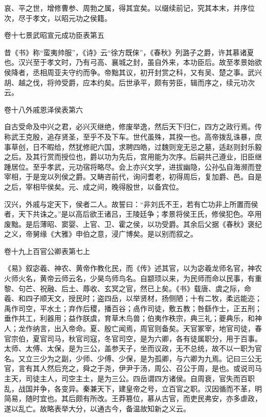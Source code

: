 \documentclass[12pt,UTF8]{ctexbook}
\begin{document}
哀、平之世，增修曹参、周勃之属，得其宜矣。以缀续前记，究其本末，并序位次，尽于孝文，以昭元功之侯籍。





卷十七景武昭宣元成功臣表第五



昔《书》称“蛮夷帅服”，《诗》云“徐方既俫”，《春秋》列潞子之爵，许其慕诸夏也。汉兴至于孝文时，乃有弓高、襄城之封，虽自外来，本功臣后。故至孝景始欲侯降者，丞相周亚夫守约而争。帝黜其议，初开封赏之科，又有吴、楚之事。武兴胡、越之伐，将帅受爵，应本约矣。后世承平，颇有劳臣，辑而序之，续元功次云。





卷十八外戚恩泽侯表第六



自古受命及中兴之君，必兴灭继绝，修废举逸，然后天下归仁，四方之政行焉。传称武王克殷，追存贤圣，至乎不及下车。世代虽殊，其揆一也。高帝拨乱诛暴，庶事草创，日不暇给，然犹修祀六国，求聘四皓，过魏则宠无忌之墓，适赵则封乐毅之后。及其行赏而授位也，爵以功为先后，宫用能为次序。后嗣共己遵业，旧臣继踵居位。至乎孝武，元功宿将略尽。会上亦兴文学，进拔幽隐，公孙弘自海濒而登宰相，于是宠以列侯之爵。又畴咨前代，询问耆老，初得周后，复加爵、邑。自是之后，宰相毕侯矣。元、成之间，晚得殷世，以备宾位。



汉兴，外戚与定天下，侯者二人。故誓曰：“非刘氏不王，若有亡功非上所置而侯者，天下共诛之。”是以高后欲王诸吕，王陵廷争；孝景将侯王氏，修侯犯色。卒用废黜。是后薄昭、窦婴、上官、卫、霍之侯，以功受爵。其余后父据《春秋》褒纪之义，帝舅缘《大雅》申伯之意，浸广博矣。是以别而叙之。





卷十九上百官公卿表第七上



《易》叙宓羲、神农、黄帝作教化民，而《传》述其官，以为宓羲龙师名官，神农火师火名，黄帝云师云名，少昊鸟师鸟名。自颛顼以来，为民师而命以民事，有重黎、句芒、祝融、后土、蓐收、玄冥之官，然已上矣。《书》载唐、虞之际，命羲、和四子顺天文，授民时；盗四岳，以举贤材，扬侧陋；十有二牧，柔远能迩；禹作司空，平水土；弃作后稷，播百谷；卨作司徒，敷五教；咎繇作士，正五刑；垂作共工，利器用；益作朕虞，育草木鸟兽；伯夷作秩宗，典三礼；夔典乐，和神人；龙作纳言，出入帝命。夏、殷亡闻焉，周官则备矣。天官冢宰，地官司徒，春官宗伯，夏官司马，秋官司寇，冬官司空，是为六卿，各有徒属职分，用于百事。太师、太傅、太保，是为三公，盖参天子，坐而议政，无不总统，故不以一职为官名。又立三少为之副，少师、少傅、少保，是为孤卿，与六卿为九焉。记曰三公无官，言有其人然后充之，舜之于尧，伊尹于汤，周公、召公于周，是也。或说司马主天，司徒主人，司空主土，是为三公。四岳谓四方诸侯。自周衰，官失而百职乱，战国并争，各变异。秦兼天下，建皇帝之号，立百官之职。汉因循而不革，明简易，随时宜也。其后颇有所改。王莽篡位，慕从古官，而吏民弗安，亦多虐政，遂以乱亡。故略表举大分，以通古今，备温故知新之义云。
\end{document}

